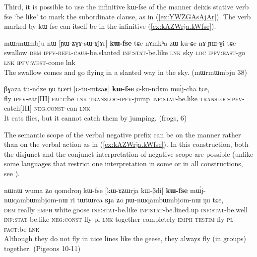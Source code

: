 \documentclass[oldfontcommands,oneside,a4paper,11pt]{article}
\newcommand{\ipa}[1]{{\phon \mbox{#1}}} %
\newcommand{\refb}[1]{(\ref{#1})}
\begin{document}
 

Third, it is possible to use the infinitive   \ipa{kɯ-fse} of the manner deixis stative verb \ipa{fse} `be like' to mark the subordinate clause, as in \refb{ex:YWZGAsAjAr}. The verb  marked by   \ipa{kɯ-fse} can itself be in the infinitive \refb{ex:kAZWrja.kWfse}.

\begin{exe}
\ex \label{ex:YWZGAsAjAr}
\gll
 	\ipa{mɯrmɯmbju} 	\ipa{nɯ} 	[\ipa{ɲɯ-ʑɣɤ-sɯ-ɤjɤr}] 	\ipa{\textbf{kɯ-fse}} 	\ipa{tɕe} 	\ipa{nɤmkʰa} 	\ipa{zɯ} 	\ipa{ku-ɕe} 	\ipa{nɤ} 	\ipa{ɲɯ-ɣi} 	\ipa{tɕe} 	\\
 	swallow \textsc{dem} \textsc{ipfv-refl-caus}-be.slanted \textsc{inf:stat}-be.like \textsc{lnk} sky \textsc{loc}  \textsc{ipfv:east}-go \textsc{lnk} \textsc{ipfv:west}-come lnk \\
\glt The swallow comes and go flying in a slanted way in the sky. (mɯrmɯmbju 38)
\end{exe}

\begin{exe}
\ex \label{ex:YWZGAsAjAr}
\gll
\ipa{βɣaza}         	\ipa{tu-ndze}         	\ipa{ŋu}         	\ipa{tɕeri}         	[\ipa{ɕ-tu-mtsaʁ}]         	\ipa{\textbf{kɯ-fse}}         	\ipa{ɕ-ku-ndɤm}         	\ipa{mɯ́j-cha}         	\ipa{tɕe,}         \\
fly \textsc{ipfv}-eat[III] \textsc{fact}:be \textsc{lnk} \textsc{transloc-ipfv}-jump  \textsc{inf:stat}-be.like  \textsc{transloc-ipfv}-catch[III] \textsc{neg:const}-can \textsc{lnk} \\
\glt It eats flies, but it cannot catch them by jumping. (frogs, 6)
\end{exe}

The semantic scope of the verbal negative prefix can be on the manner rather than on the verbal action as in \refb{ex:kAZWrja.kWfse}.  In this construction, both the disjunct and the conjunct interpretation of negative scope are possible (unlike some languages that restrict one interpretation in some or in all constructions, see \citealt[61]{bickel10linking}).

\begin{exe}
\ex \label{ex:kAZWrja.kWfse}
\gll
\ipa{nɯnɯ} 	\ipa{wuma} 	\ipa{ʑo} 	\ipa{qomdroŋ} 	\ipa{kɯ-fse} 	[\ipa{kɯ-ɤʑɯrja} 	\ipa{kɯ-βdi}] 	\ipa{\textbf{kɯ-fse}} 	\ipa{mɯ́j-nɯqambɯmbjom-nɯ} 	\ipa{ri} \ipa{tɯtɯrca} 	\ipa{ʁɟa} 	\ipa{ʑo} 	\ipa{ɲɯ-nɯqambɯmbjom-nɯ} 	\ipa{ŋu} 	\ipa{tɕe,} 
\\
\textsc{dem} really \textsc{emph} white.goose  \textsc{inf:stat}-be.like  \textsc{inf:stat}-be.lined.up   \textsc{inf:stat}-be.well \textsc{inf:stat}-be.like \textsc{neg:const}-fly-pl \textsc{lnk} together completely \textsc{emph} \textsc{testim}-fly-\textsc{pl} \textsc{fact}:be \textsc{lnk} \\
\glt Although they do not fly in nice lines like the geese, they always fly (in groups) together. (Pigeons 10-11)
\end{exe}
 
\end{document}
